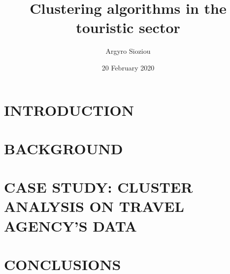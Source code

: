 \documentclass[12pt, onside]{book}
\title{Clustering algorithms in the touristic sector}
\author{Argyro Sioziou}
\date{20 February 2020}
\begin{document}




\tableofcontents

\chapter{INTRODUCTION}


\chapter{BACKGROUND}


\chapter{CASE STUDY: CLUSTER ANALYSIS ON TRAVEL AGENCY'S DATA}


\chapter{CONCLUSIONS}


\printbibliography
{}
\end{document}
